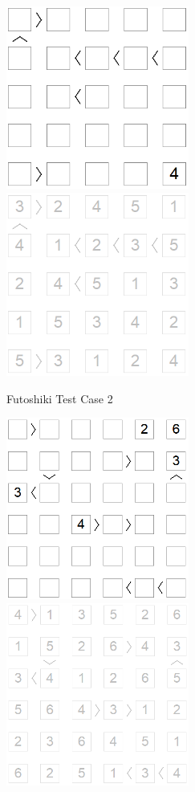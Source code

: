 ﻿\documentclass[a4paper, 11pt]{article}
\begin{document}
\begin{enumerate}
\begin{figure}[htbp]
    \includegraphics[width=6cm]{Pic/f2}
    \qquad
    \includegraphics[width=6cm]{Pic/f2s}
    \caption{Futoshiki Test Case 2}
    \label{fig:case22}
  \end{figure}
        \begin{figure}[htbp]
    \centering
    \includegraphics[width=6cm]{Pic/f3}
    \qquad
    \includegraphics[width=6cm]{Pic/f3s}

\end{figure}
\end{enumerate}
\end{document}
